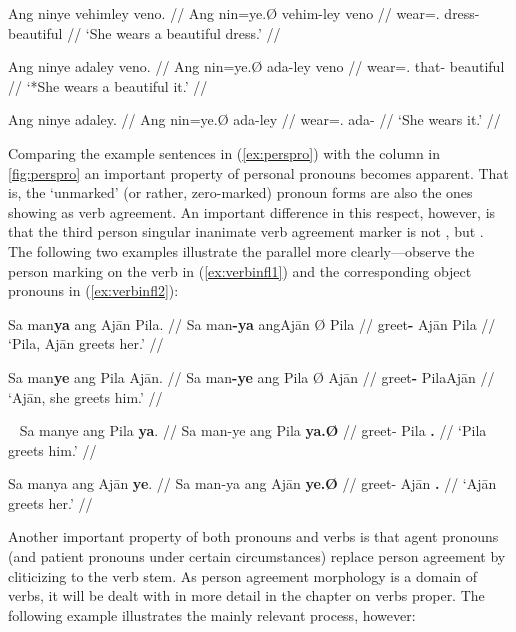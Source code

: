 \pex\label{ex:procompldist}
\a\begingl
	\gla Ang ninye vehimley veno. //
	\glb Ang nin=ye.Ø vehim-ley veno //
	\glc \Aarg{} wear=\TsgF{}.\Top{} dress-\PargI{} beautiful //
	\glft `She wears a beautiful dress.' //
\endgl

\a\begingl
	\gla *Ang ninye adaley veno. //
	\glb Ang nin=ye.Ø ada-ley veno //
	\glc \Aarg{} wear=\TsgF{}.\Top{} that-\PargI{} beautiful //
	\glft `*She wears a beautiful it.' //
\endgl

\a\begingl
	\gla Ang ninye adaley. //
	\glb Ang nin=ye.Ø ada-ley //
	\glc \Aarg{} wear=\TsgF{}.\Top{} ada-\PargI{} //
	\glft `She wears it.' //
\endgl

\xe

Comparing the example sentences in (\ref{ex:perspro}) with the \Top{} column in 
\autoref{fig:perspro} an important property of personal pronouns becomes 
apparent. That is, the `unmarked' (or rather, zero-marked) pronoun forms are 
also the ones showing as verb agreement. An important difference in this 
respect, however, is that the third person singular inanimate verb agreement 
marker is not , but . The following two examples 
illustrate the parallel more clearly---observe the person marking on the verb in 
(\ref{ex:verbinfl1}) and the corresponding object pronouns in 
(\ref{ex:verbinfl2}):

\pex\label{ex:verbinfl1}
\a\begingl
	\gla Sa man\textbf{ya} ang Ajān {} Pila. //
	\glb Sa man\textbf{-ya} ang ​Ajān Ø ​Pila //
	\glc \PatT{} greet\textbf{-\TsgM{}} \Aarg{} ​Ajān \Top{} ​Pila //
	\glft `Pila, Ajān greets her.' //
\endgl

\a\begingl
	\gla Sa man\textbf{ye} ang Pila {} Ajān. //
	\glb Sa man\textbf{-ye} ang Pila Ø ​Ajān //
	\glc \PatT{} greet\textbf{-\TsgF{}} \Aarg{} Pila \Top{} ​Ajān //
	\glft `Ajān, she greets him.' //
\endgl

\xe

\pex~\label{ex:verbinfl2}
\a\begingl
	\gla Sa manye ang Pila \textbf{ya}. //
	\glb Sa man-ye ang Pila \textbf{ya.Ø} //
	\glc \PatT{} greet-\TsgF{} \Aarg{} Pila \textbf{\TsgM{}.\Top{}} //
	\glft `Pila greets him.' //
\endgl

\a\begingl
	\gla Sa manya ang Ajān \textbf{ye}. //
	\glb Sa man-ya ang ​Ajān \textbf{ye.Ø} //
	\glc \PatT{} greet-\TsgM{} \Aarg{} ​Ajān \textbf{\TsgF{}.\Top{}} //
	\glft `Ajān greets her.' //
\endgl

\xe

Another important property of both pronouns and verbs is that agent pronouns 
(and patient pronouns under certain circumstances) replace person agreement by 
cliticizing to the verb stem. As person agreement morphology is a domain of 
verbs, it will be dealt with in more detail in the chapter on verbs proper. The 
following example illustrates the mainly relevant process, however:

